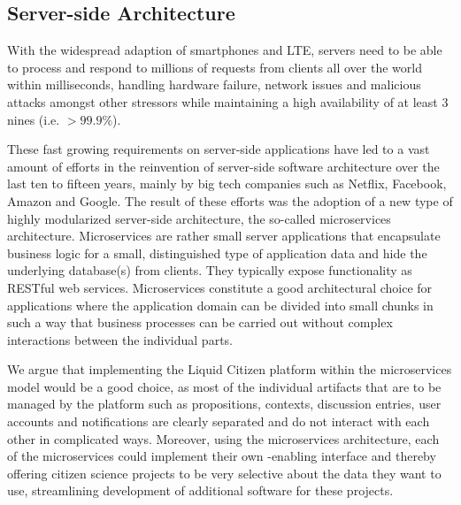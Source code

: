 \subsection{Server-side Architecture}
\label{ssec:ServerSideArchitecture}

With the widespread adaption of smartphones and LTE, servers need to be able to process and respond to millions of requests from clients all over the world within milliseconds, handling hardware failure, network issues and malicious attacks amongst other stressors while maintaining a high availability of at least 3 nines (i.e. $>99.9\%$).

These fast growing requirements on server-side applications have led to a vast amount of efforts in the reinvention of server-side software architecture over the last ten to fifteen years, mainly by big tech companies such as Netflix, Facebook, Amazon and Google.
The result of these efforts was the adoption of a new type of highly modularized server-side architecture, the so-called microservices architecture.
Microservices are rather small server applications that encapsulate business logic for a small, distinguished type of application data and hide the underlying database(s) from clients.
They typically expose functionality as RESTful web services.
Microservices constitute a good architectural choice for applications where the application domain can be divided into small chunks in such a way that business processes can be carried out without complex interactions between the individual parts.

We argue that implementing the Liquid Citizen platform within the microservices model would be a good choice, as most of the individual artifacts that are to be managed by the platform such as propositions, contexts, discussion entries, user accounts and notifications are clearly separated and do not interact with each other in complicated ways.
Moreover, using the microservices architecture, each of the microservices could implement their own -enabling interface and thereby offering citizen science projects to be very selective about the data they want to use, streamlining development of additional software for these projects.

%



